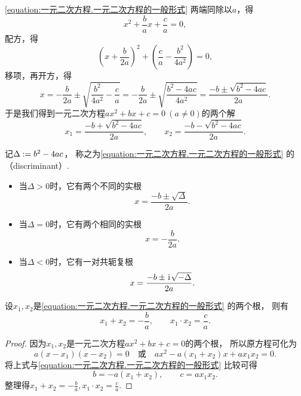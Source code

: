 \cref{equation:一元二次方程.一元二次方程的一般形式} 两端同除以\(a\)，得\begin{equation*}
	x^2 + \frac{b}{a} x + \frac{c}{a} = 0,
\end{equation*}
配方，得\begin{equation*}
	\left( x + \frac{b}{2a} \right)^2 + \left( \frac{c}{a} - \frac{b^2}{4a^2} \right) = 0,
\end{equation*}
移项，再开方，得\begin{equation*}
	x = -\frac{b}{2a} \pm \sqrt{\frac{b^2}{4a^2} - \frac{c}{a}}
	= -\frac{b}{2a} \pm \sqrt{\frac{b^2-4ac}{4a^2}}
	= \frac{-b \pm \sqrt{b^2-4ac}}{2a}.
\end{equation*}
于是我们得到一元二次方程\(ax^2 + bx + c = 0\ (a\neq0)\)的两个解\begin{equation*}
	x_1 = \frac{-b + \sqrt{b^2-4ac}}{2a},
	\qquad
	x_2 = \frac{-b - \sqrt{b^2-4ac}}{2a}.
\end{equation*}

\begin{theorem}
记\(\Delta := b^2-4ac\)，
称之为\cref{equation:一元二次方程.一元二次方程的一般形式}
的（{\rm discriminant}）.
\begin{itemize}
	\item 当\(\Delta > 0\)时，它有两个不同的实根\begin{equation*}
		x = \frac{-b \pm \sqrt{\Delta}}{2a}.
	\end{equation*}
	\item 当\(\Delta = 0\)时，它有两个相同的实根\begin{equation*}
		x = -\frac{b}{2a}.
	\end{equation*}
	\item 当\(\Delta < 0\)时，它有一对共轭复根\begin{equation*}
		x = \frac{-b \pm \kern1pt\mathrm{i}\kern1pt \sqrt{-\Delta}}{2a}.
	\end{equation*}
\end{itemize}
\end{theorem}

\begin{theorem}[韦达定理]\label{theorem:一元二次方程.韦达定理}
设\(x_1,x_2\)是\cref{equation:一元二次方程.一元二次方程的一般形式} 的两个根，
则有\begin{equation*}
	x_1 + x_2 = -\frac{b}{a},
	\qquad
	x_1 \cdot x_2 = \frac{c}{a}.
\end{equation*}
\begin{proof}
因为\(x_1,x_2\)是一元二次方程\(ax^2 + bx + c = 0\)的两个根，
所以原方程可化为\begin{equation*}
	a(x - x_1)(x - x_2) = 0
	\quad\text{或}\quad
	a x^2 - a (x_1 + x_2) x + a x_1 x_2 = 0.
\end{equation*}
将上式与\cref{equation:一元二次方程.一元二次方程的一般形式} 比较可得\begin{equation*}
	b = -a (x_1 + x_2),
	\qquad
	c = a x_1 x_2.
\end{equation*}
整理得\(x_1 + x_2 = -\frac{b}{a}, x_1 \cdot x_2 = \frac{c}{a}\).
\end{proof}
\end{theorem}

